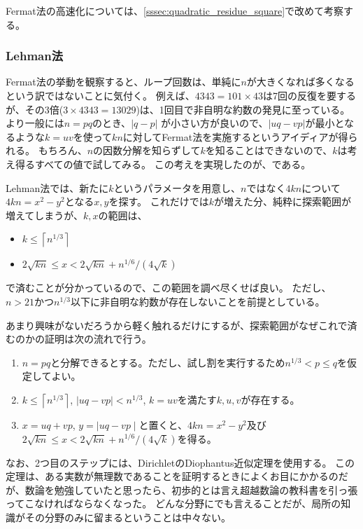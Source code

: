 Fermat法の高速化については、\ref{sssec:quadratic_residue_square}で改めて考察する。

\subsubsection{Lehman法}
Fermat法の挙動を観察すると、ループ回数は、単純に$n$が大きくなれば多くなるという訳ではないことに気付く。
例えば、$4343=101\times43$は7回の反復を要するが、その3倍($3\times4343=13029$)は、1回目で非自明な約数の発見に至っている。
より一般には$n=pq$のとき、$|q-p|$ が小さい方が良いので、$|uq-vp|$が最小となるような$k=uv$を使って$kn$に対してFermat法を実施するというアイディアが得られる。
もちろん、$n$の因数分解を知らずして$k$を知ることはできないので、$k$は考え得るすべての値で試してみる。
この考えを実現したのが、である。

Lehman法では、新たに$k$というパラメータを用意し、$n$ではなく$4kn$について$4kn=x^2-y^2$となる$x,y$を探す。
これだけでは$k$が増えた分、純粋に探索範囲が増えてしまうが、$k,x$の範囲は、
\begin{itemize}
\item $k \le \left \lceil n^{1/3}\right \rceil$
\item $2\sqrt{kn}\le x < 2\sqrt{kn}+n^{1/6}/(4\sqrt{k})$
\end{itemize}
で済むことが分かっているので、この範囲を調べ尽くせば良い。
ただし、$n>21$かつ$n^{1/3}$以下に非自明な約数が存在しないことを前提としている。


あまり興味がないだろうから軽く触れるだけにするが、探索範囲がなぜこれで済むのかの証明は次の流れで行う。
\begin{enumerate}
 \item $n=pq$と分解できるとする。ただし、試し割を実行するため$n^{1/3}<p\le q$を仮定してよい。
 \item $k \le \left \lceil n^{1/3}\right \rceil$, $\mid uq - vp \mid < n^{1/3}$, $k = uv$を満たす$k, u, v$が存在する。
 \item $x = uq + vp$, $y = \mid uq - vp \mid$と置くと、$4kn=x^2-y^2$及び$2\sqrt{kn}\le x < 2\sqrt{kn}+n^{1/6}/(4\sqrt{k})$を得る。
\end{enumerate}

なお、2つ目のステップには、DirichletのDiophantus近似定理を使用する。
この定理は、ある実数が無理数であることを証明するときによくお目にかかるのだが、数論を勉強していたと思ったら、初歩的とは言え超越数論の教科書を引っ張ってこなければならなくなった。
どんな分野にでも言えることだが、局所の知識がその分野のみに留まるということは中々ない。

